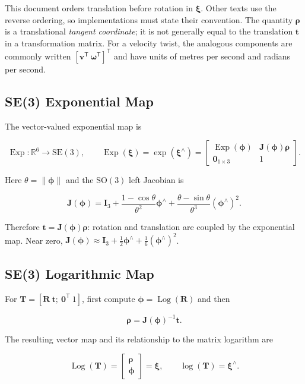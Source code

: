 \documentclass[10pt,a4paper]{article}
\numberwithin{equation}{section}
\newcommand{\Subsection}[1]{\subsection{#1}}
\newcommand{\SOthree}{\mathrm{SO}(3)}
\newcommand{\SEthree}{\mathrm{SE}(3)}
\newcommand{\Exp}{\operatorname{Exp}}
\newcommand{\Log}{\operatorname{Log}}
\newcommand{\vect}[1]{\boldsymbol{#1}}
\theoremstyle{definition}
\theoremstyle{exercisestyle}
\begin{document}
This document orders translation before rotation in $\vect{\xi}$. Other texts
use the reverse ordering, so implementations must state their convention. The
quantity $\vect{\rho}$ is a translational \emph{tangent coordinate}; it is not
generally equal to the translation $\mathbf{t}$ in a transformation matrix.
For a velocity twist, the analogous components are commonly written
$[\mathbf{v}^{\mathsf T}\ \vect{\omega}^{\mathsf T}]^{\mathsf T}$ and have
units of metres per second and radians per second.

\Subsection{SE(3) Exponential Map}

The vector-valued exponential map is

\begin{equation}
    \Exp:\mathbb{R}^6\rightarrow\SEthree,
    \qquad
    \Exp(\vect{\xi})
    =\exp(\vect{\xi}^\wedge)
    =\begin{bmatrix}
        \Exp(\vect{\phi})     & \mathbf{J}(\vect{\phi})\vect{\rho} \\
        \mathbf{0}_{1\times3} & 1
    \end{bmatrix}.
    \label{eq:se3-exp}
\end{equation}

Here $\theta=\|\vect{\phi}\|$ and the $\SOthree$ left Jacobian is

\begin{equation}
    \mathbf{J}(\vect{\phi})
    =\mathbf{I}_3
    +\frac{1-\cos\theta}{\theta^2}\vect{\phi}^\wedge
    +\frac{\theta-\sin\theta}{\theta^3}(\vect{\phi}^\wedge)^2.
    \label{eq:so3-left-jacobian}
\end{equation}

Therefore $\mathbf{t}=\mathbf{J}(\vect{\phi})\vect{\rho}$: rotation and
translation are coupled by the exponential map. Near zero,
$\mathbf{J}(\vect{\phi})\approx\mathbf{I}_3+\tfrac12\vect{\phi}^\wedge+
    \tfrac16(\vect{\phi}^\wedge)^2$.

\Subsection{SE(3) Logarithmic Map}

For $\mathbf{T}=[\mathbf{R}\ \mathbf{t};\ \mathbf{0}^{\mathsf T}\ 1]$, first
compute $\vect{\phi}=\Log(\mathbf{R})$ and then

\begin{equation}
    \vect{\rho}=\mathbf{J}(\vect{\phi})^{-1}\mathbf{t}.
\end{equation}

The resulting vector map and its relationship to the matrix logarithm are

\begin{equation}
    \Log(\mathbf{T})=
    \begin{bmatrix}\vect{\rho}\\\vect{\phi}\end{bmatrix}
    =\vect{\xi},
    \qquad
    \log(\mathbf{T})=\vect{\xi}^\wedge.
    \label{eq:se3-log}
\end{equation}
\end{document}
